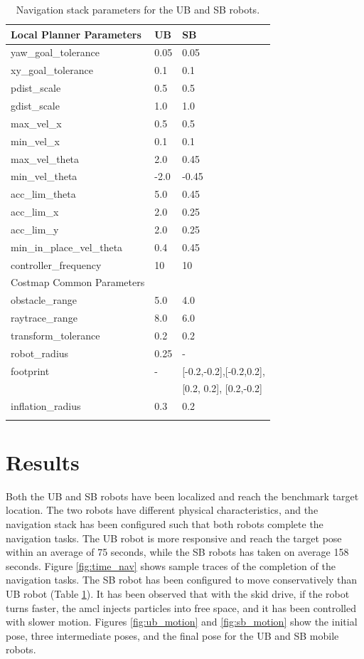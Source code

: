 \documentclass[10pt,journal,compsoc]{IEEEtran}
\begin{document}
\begin{table}[h]
\caption{Navigation stack parameters for the UB and SB robots.}
\label{tab:planner}
\begin{center}
\begin{tabular}{|l||l|l|}
\hline
Local Planner Parameters & UB & SB\\
\hline
yaw\_goal\_tolerance &  0.05& 0.05\\
xy\_goal\_tolerance &  0.1& 0.1\\
pdist\_scale &  0.5& 0.5\\
gdist\_scale &  1.0& 1.0\\
max\_vel\_x &  0.5& 0.5\\
min\_vel\_x &  0.1& 0.1\\
max\_vel\_theta & 2.0 & 0.45\\
min\_vel\_theta &  -2.0& -0.45\\
acc\_lim\_theta &  5.0& 0.45\\
acc\_lim\_x & 2.0 & 0.25\\
acc\_lim\_y &  2.0& 0.25\\
min\_in\_place\_vel\_theta & 0.4 & 0.45\\
controller\_frequency &  10& 10\\
\hline
Costmap Common Parameters && \\
\hline
obstacle\_range  & 5.0 & 4.0 \\
raytrace\_range & 8.0 & 6.0\\
transform\_tolerance & 0.2 & 0.2\\
robot\_radius &  0.25& -\\
footprint &  - & [-0.2,-0.2],[-0.2,0.2],\\  
 &  &  [0.2, 0.2], [0.2,-0.2]\\
inflation\_radius & 0.3 & 0.2\\  
  &  & \\              
\hline
\end{tabular}
\end{center}
\end{table}



\section{Results}

Both the UB and SB robots have been localized and reach the benchmark target location. The two robots have different  physical characteristics, and the navigation stack has been configured such that both robots complete the navigation tasks. The UB robot is more responsive and reach the target pose within an average of 75 seconds, while the SB robots has taken on average 158 seconds. Figure \ref{fig:time_nav} shows sample traces of the completion of the navigation tasks. The SB robot has been configured to move conservatively than UB robot (Table \ref{tab:planner}). It has been observed that with the skid drive, if the robot turns faster, the amcl  injects particles into free space, and it has been controlled with slower motion. Figures \ref{fig:ub_motion} and \ref{fig:sb_motion} show the initial pose, three intermediate poses, and the final pose for the UB  and SB mobile robots.    
\end{document}
